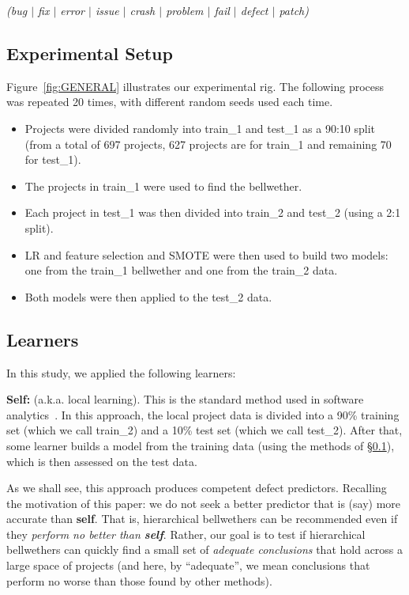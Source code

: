 \documentclass[10pt,journal,compsoc]{IEEEtran}
\newcommand{\fig}[1]{Figure~\ref{fig:#1}}
\newcommand{\bi}{\begin{itemize}}
\newcommand{\ei}{\end{itemize}}
\begin{document}
\begin{center}
\textit{(bug $\mid$ fix $\mid$ error $\mid$ issue $\mid$ crash $\mid$ problem $\mid$ fail $\mid$ defect $\mid$ patch)}
\end{center}
 




\subsection{Experimental Setup}
\label{sec:Experimental}


\fig{GENERAL} illustrates our experimental rig. 
 The following process was repeated 20 times, with different random seeds used each time.
 \bi
 \item
 Projects were divided
 randomly into train\_1 and test\_1 as a 90:10 split (from a total of 697 projects, 627 projects are for train\_1 and remaining 70 for test\_1).
 \item
 The projects in train\_1 were used to find the bellwether.
 \item
 Each   project in test\_1 was  then divided into train\_2 and test\_2 (using a 2:1 split).
 \item
 LR and feature selection and SMOTE were then used
 to build two models: one from the train\_1 bellwether and one from the train\_2
 data.
 \item
 Both models were then applied to the test\_2 data.
 \ei
 






 
\subsection{Learners}\label{mylearners}

In this study, we applied the following learners:

%

\textbf{Self:} (a.k.a. local learning). This  is the standard method used in software analytics~\cite{menzies2013software,zhang2013software}.
In this approach, the local project data is divided into a 90\% training set (which we call  train\_2)
and a 10\% test set (which we call test\_2). After that, some learner builds a model from the training data
(using the methods of \S\ref{sec:Experimental}),
which is then assessed on the test data.

As we shall see, this approach produces competent defect predictors.
Recalling
the motivation of this paper: we do not
seek a better predictor that is (say) more accurate
than {\bf self}.
That is, hierarchical bellwethers can be recommended even if they {\em 
perform  no better  than {\bf self}}. Rather, our goal is to test if hierarchical bellwethers
can quickly  find a  small set of {\em adequate conclusions}
that hold across a large space 
of projects
(and here, by ``adequate'', we mean conclusions
that perform no worse than those found by other methods).
\end{document}
